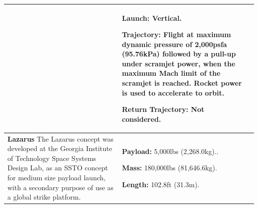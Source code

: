 {\begin{landscape}
\begin{xltabular}{\linewidth}{|X|X|X|}
			&
			\small {}
			
			\textbf{Launch:} Vertical. 
			
			\textbf{Trajectory:} Flight at maximum dynamic pressure of 2,000psfa (95.76kPa) followed by a pull-up under scramjet power, when the maximum Mach limit of the scramjet is reached. Rocket power is used to accelerate to orbit. 
			
			\textbf{Return Trajectory:} Not considered. 
			\\
			\hline \small\textbf{Lazarus}\cite{Young2006} \newline \newline 
			The Lazarus concept was developed at the Georgia Institute of Technology Space Systems Design Lab, as an SSTO concept for medium size payload launch, with a secondary purpose of use as a global strike platform. 
			
			&\small {}  
			
			\textbf{Payload:} 5,000lbs (2,268.0kg)..
			
			\textbf{Mass:} 180,000lbs (81,646.6kg).
			
			\textbf{Length:} 102.8ft (31.3m). 
			

\end{xltabular}
\end{landscape}}
